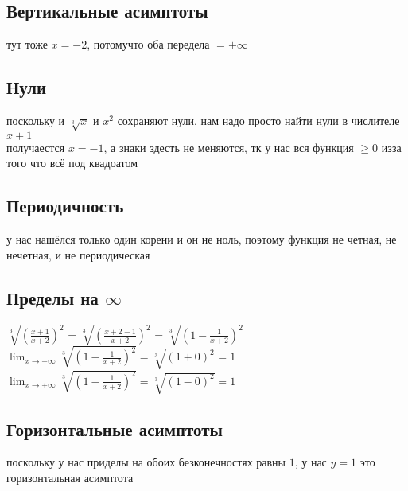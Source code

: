 \documentclass{article}
\newcommand{\ds}{\displaystyle}
\begin{document}
  \subsection{Вертикальные асимптоты}
  тут тоже $x=-2$, потомучто оба передела $=+\infty$

  \subsection{Нули}
  поскольку и $\sqrt[3]{x}$ и $x^2$ сохраняют нули, нам надо просто найти нули в числителе $x+1$ \\
  получаестся $x=-1$, а знаки здесть не меняются, тк у нас вся функция $\geq 0$ изза того что всё под квадоатом \\

  \subsection{Периодичность}
  у нас нашёлся только один корени и он не ноль, поэтому функция не четная, не нечетная, и не периодическая

  \subsection{Пределы на $\infty$}
  $\ds \sqrt[3]{\left(\frac{x+1}{x+2}\right)^2} = \sqrt[3]{\left(\frac{x+2-1}{x+2}\right)^2} = \sqrt[3]{\left(1-\frac{1}{x+2}\right)^2}$ \\
  $\ds \lim_{x \to -\infty} \sqrt[3]{\left(1-\frac{1}{x+2}\right)^2} = \sqrt[3]{\left(1+0\right)^2} = 1$ \\
  $\ds \lim_{x \to +\infty} \sqrt[3]{\left(1-\frac{1}{x+2}\right)^2} = \sqrt[3]{\left(1-0\right)^2} = 1$

  \subsection{Горизонтальные асимптоты}
  поскольку у нас приделы на обоих безконечностях равны $1$, у нас $y=1$ это горизонтальная асимптота
\end{document}
